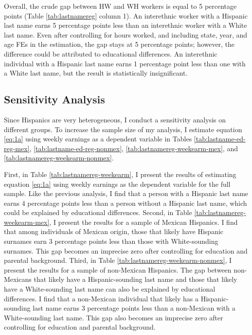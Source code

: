 Overall, the crude gap between HW and WH workers is equal to 5 percentage points (Table \ref{tab:lastnamereg} column 1). An interethnic worker with a Hispanic last name earns 5 percentage points less than an interethnic worker with a White last name. Even after controlling for hours worked, and including state, year, and age FEs in the estimation, the gap stays at 5 percentage points; however, the difference could be attributed to educational differences. An interethnic individual with a Hispanic last name earns 1 percentage point less than one with a White last name, but the result is statistically insignificant.


\subsection{Sensitivity Analysis}

Since Hispanics are very heterogeneous, I conduct a sensitivity analysis on different groups. To increase the sample size of my analysis, I estimate equation \ref{eq:1a} using weekly earnings as a dependent variable in Tables \ref{tab:lastname-ed-reg-mex}, \ref{tab:lastname-ed-reg-nonmex}, \ref{tab:lastnamereg-weekearm-mex}, and \ref{tab:lastnamereg-weekearm-nonmex}. 

First, in Table \ref{tab:lastnamereg-weekearm}, I present the results of estimating equation \ref{eq:1a} using weekly earnings as the dependent variable for the full sample. Like the previous analysis, I find that a person with a Hispanic last name earns 4 percentage points less than a person without a Hispanic last name, which could be explained by educational differences. Second, in Table \ref{tab:lastnamereg-weekearm-mex}, I present the results for a sample of Mexican Hispanics. I find that among individuals of Mexican origin, those that likely have Hispanic surnames earn 3 percentage points less than those with White-sounding surnames. This gap becomes an imprecise zero after controlling for education and parental background. Third, in Table \ref{tab:lastnamereg-weekearm-nonmex}, I present the results for a sample of non-Mexican Hispanics. The gap between non-Mexicans that likely have a Hispanic-sounding last name and those that likely have a White-sounding last name can also be explained by educational differences. I find that a non-Mexican individual that likely has a Hispanic-sounding last name earns 3 percentage points less than a non-Mexican with a White-sounding last name. This gap also becomes an imprecise zero after controlling for education and parental background.

